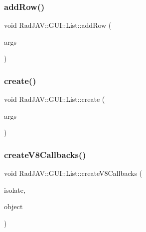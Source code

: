 \subsubsection{\texorpdfstring{add\+Row()}{addRow()}}
{\footnotesize\ttfamily void Rad\+J\+A\+V\+::\+G\+U\+I\+::\+List\+::add\+Row (\begin{DoxyParamCaption}\item[{const v8\+::\+Function\+Callback\+Info$<$ v8\+::\+Value $>$ \&}]{args }\end{DoxyParamCaption})\hspace{0.3cm}{\ttfamily [static]}}

\mbox{\label{class_rad_j_a_v_1_1_g_u_i_1_1_list_a79f07ed732f9497a27e3302613636c35}} 
\subsubsection{\texorpdfstring{create()}{create()}}
{\footnotesize\ttfamily void Rad\+J\+A\+V\+::\+G\+U\+I\+::\+List\+::create (\begin{DoxyParamCaption}\item[{const v8\+::\+Function\+Callback\+Info$<$ v8\+::\+Value $>$ \&}]{args }\end{DoxyParamCaption})\hspace{0.3cm}{\ttfamily [static]}}

\mbox{\label{class_rad_j_a_v_1_1_g_u_i_1_1_list_a14170c0d31c6fc39368831a5afcd16c0}} 
\subsubsection{\texorpdfstring{create\+V8\+Callbacks()}{createV8Callbacks()}}
{\footnotesize\ttfamily void Rad\+J\+A\+V\+::\+G\+U\+I\+::\+List\+::create\+V8\+Callbacks (\begin{DoxyParamCaption}\item[{v8\+::\+Isolate $\ast$}]{isolate,  }\item[{v8\+::\+Local$<$ v8\+::\+Object $>$}]{object }\end{DoxyParamCaption})\hspace{0.3cm}{\ttfamily [static]}}

